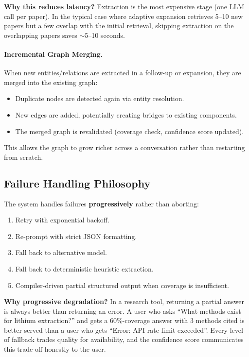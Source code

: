 \documentclass[11pt]{article}
\begin{document}
\textbf{Why this reduces latency?} Extraction is the most expensive stage (one LLM call per paper). In the typical case where adaptive expansion retrieves 5--10 new papers but a few overlap with the initial retrieval, skipping extraction on the overlapping papers saves $\sim$5--10 seconds.

\paragraph{Incremental Graph Merging.} When new entities/relations are extracted in a follow-up or expansion, they are merged into the existing graph:

\begin{itemize}[leftmargin=1.2em]
  \item Duplicate nodes are detected again via entity resolution.
  \item New edges are added, potentially creating bridges to existing components.
  \item The merged graph is revalidated (coverage check, confidence score updated).
\end{itemize}

This allows the graph to grow richer across a conversation rather than restarting from scratch.

\subsection{Failure Handling Philosophy}

The system handles failures \textbf{progressively} rather than aborting:

\begin{enumerate}[leftmargin=1.2em]
  \item Retry with exponential backoff.
  \item Re-prompt with strict JSON formatting.
  \item Fall back to alternative model.
  \item Fall back to deterministic heuristic extraction.
  \item Compiler-driven partial structured output when coverage is insufficient.
\end{enumerate}

\textbf{Why progressive degradation?} In a research tool, returning a partial answer is always better than returning an error. A user who asks ``What methods exist for lithium extraction?'' and gets a 60\%-coverage answer with 3 methods cited is better served than a user who gets ``Error: API rate limit exceeded''. Every level of fallback trades quality for availability, and the confidence score communicates this trade-off honestly to the user.
\end{document}
